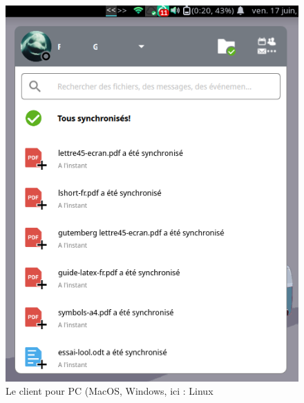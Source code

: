 \begin{multicols}{2}

\begin{figure}
	\centering
	\includegraphics{./Captures/nextcloud-client.fenetre.principale.png}
	\caption{Le client pour PC (MacOS, Windows, ici : Linux}
\end{figure}

\columnbreak


\end{multicols}
